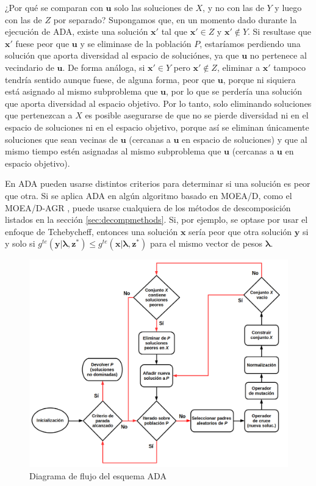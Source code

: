 ¿Por qué se comparan con $\textbf{u}$ solo las soluciones de $X$, y no con las de $Y$ y luego con las de $Z$ por separado? Supongamos que, en un momento dado durante la ejecución de ADA, existe una solución $\textbf{x}'$ tal que $\textbf{x}' \in Z$ y $\textbf{x}' \not\in Y$. Si resultase que $\textbf{x}'$ fuese peor que $\textbf{u}$ y se eliminase de la población $P$, estaríamos perdiendo una solución que aporta diversidad al espacio de soluciónes, ya que $\textbf{u}$ no pertenece al vecindario de $\textbf{u}$. De forma análoga, si $\textbf{x}' \in Y$ pero $\textbf{x}' \not\in Z$, eliminar a $\textbf{x}'$ tampoco tendría sentido aunque fuese, de alguna forma, peor que $\textbf{u}$, porque ni siquiera está asignado al mismo subproblema que $\textbf{u}$, por lo que se perdería una solución que aporta diversidad al espacio objetivo. Por lo tanto, solo eliminando soluciones que pertenezcan a $X$ es posible asegurarse de que no se pierde diversidad ni en el espacio de soluciones ni en el espacio objetivo, porque así se eliminan únicamente soluciones que sean vecinas de $\textbf{u}$ (cercanas a $\textbf{u}$ en espacio de soluciones) y que al mismo tiempo estén asignadas al mismo subproblema que $\textbf{u}$ (cercanas a $\textbf{u}$ en espacio objetivo).

En ADA pueden usarse distintos criterios para determinar si una solución es peor que otra. Si se aplica ADA en algún algoritmo basado en MOEA/D, como el MOEA/D-AGR \cite{wang2015adaptive}, puede usarse cualquiera de los métodos de descomposición listados en la sección \ref{sec:decompmethods}. Si, por ejemplo, se optase por usar el enfoque de Tchebycheff, entonces una solución $\textbf{x}$ sería peor que otra solución $\textbf{y}$ si y solo si $g^{te}(\textbf{y} | \boldsymbol\lambda, \textbf{z}^*) \leq g^{te}(\textbf{x} | \boldsymbol\lambda, \textbf{z}^*)$ para el mismo vector de pesos $\boldsymbol\lambda$. 

\begin{figure}
	\centering
	\includegraphics[width=1.1\textwidth]{Images/moead_ada_flowchart}
	\caption{Diagrama de flujo del esquema ADA}
	\label{fig:adaflow}
\end{figure}

